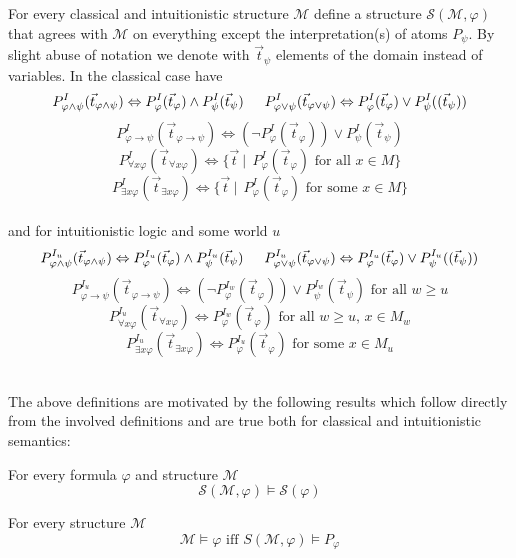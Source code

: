 \documentclass[a4paper,UKenglish,cleveref, autoref, thm-restate]{lipics-v2021}
\begin{document}
\begin{definition}
	For every classical and intuitionistic structure $\mathcal M$ define a structure $\mathcal S(\mathcal M,\varphi)$ that agrees with $\mathcal M$ on everything except the interpretation(s) of atoms $P_\psi$. By slight abuse of notation we denote with $\vec t_\psi$ elements of the domain instead of variables. In the classical case have	
	$$P_{\varphi\wedge\psi}^I(\vec t_{\varphi\wedge\psi}) \Leftrightarrow P_{\varphi}^I(\vec t_\varphi)\wedge P_{\psi}^I(\vec t_\psi)\indent P_{\varphi\vee\psi}^I(\vec t_{\varphi\vee\psi}) \Leftrightarrow P_{\varphi}^I(\vec t_\varphi)\vee P_{\psi}^I((\vec t_\psi))$$$$ P_{\varphi\to\psi}^I(\vec t_{\varphi\to\psi}) \Leftrightarrow (\neg P_{\varphi}^I(\vec t_{\varphi}))\vee P_{\psi}^I(\vec t_{\psi})$$
	$$P_{\forall x\varphi}^I(\vec t_{\forall x\varphi}) \Leftrightarrow \{\vec t\:|\:\:P_{\varphi}^I(\vec t_\varphi) \text{ for all $x\in M$}\}$$$$ P_{\exists x\varphi}^I(\vec t_{\exists x\varphi}) \Leftrightarrow \{\vec t\:|\:\:P_{\varphi}^I(\vec t_\varphi) \text{ for some $x\in M$}\}$$
	\\
	
	and for intuitionistic logic and some world $u$ 		
	$$P_{\varphi\wedge\psi}^{I_u}(\vec t_{\varphi\wedge\psi}) \Leftrightarrow P_{\varphi}^{I_u}(\vec t_\varphi)\wedge P_{\psi}^{I_u}(\vec t_\psi)\indent P_{\varphi\vee\psi}^{I_u}(\vec t_{\varphi\vee\psi}) \Leftrightarrow P_{\varphi}^{I_u}(\vec t_\varphi)\vee P_{\psi}^{I_u}((\vec t_\psi))$$$$ P_{\varphi\to\psi}^{I_u}(\vec t_{\varphi\to\psi}) \Leftrightarrow(\neg P_{\varphi}^{I_w}(\vec t_{\varphi}))\vee P_{\psi}^{I_w}(\vec t_{\psi})\text{ for all $w\geq u$}$$
	$$P_{\forall x\varphi}^{I_u}(\vec t_{\forall x\varphi}) \Leftrightarrow P_{\varphi}^{I_w}(\vec t_\varphi) \text{ for all $w\geq u$, $x\in M_w$}$$$$ P_{\exists x\varphi}^{I_u}(\vec t_{\exists x\varphi}) \Leftrightarrow P_{\varphi}^{I_u}(\vec t_\varphi) \text{ for some $x\in M_u$}$$
	\\
\end{definition}

The above definitions are motivated by the following results which follow directly from the involved definitions and are true both for classical and intuitionistic semantics:

\begin{lemma}
	For every formula $\varphi$ and structure $\mathcal M$
	$$\mathcal S(\mathcal M, \varphi)\models\mathcal S(\varphi)$$
\end{lemma}

\begin{lemma}
	For every structure $\mathcal M$
	$$\mathcal M\models \varphi\text{ iff }S(\mathcal M, \varphi)\models P_\varphi$$
\end{lemma}
\end{document}

